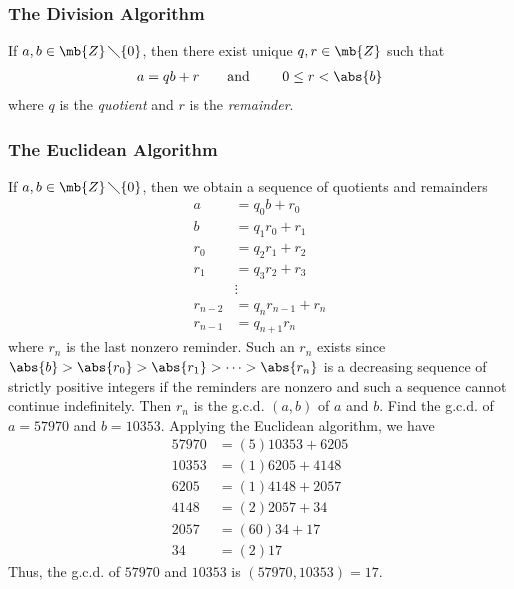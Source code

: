 \subsubsection{The Division Algorithm}
If $a,b\in \mb{Z}\,\diagdown\{0\}$, then there exist unique $q,r\in \mb{Z}$ such that
\begin{align*}
    a = qb + r \text{\qquad and \qquad} 0\le r < \abs{b}
\end{align*}
where $q$ is the {\sl quotient} and $r$ is the {\sl remainder}.
\newpage
\thispagestyle{oddpagestyle}

\subsubsection{The Euclidean Algorithm}
If $a,b\in \mb{Z}\,\diagdown\{0\}$, then we obtain a sequence of quotients and remainders
\begin{align*}
    a &= q_{0} b + r_{0}\tag{0}\\
    b &= q_{1} r_{0} + r_{1}\tag{1}\\
    r_{0} &= q_{2} r_{1} + r_{2}\tag{2}\\
    r_{1} &= q_{3} r_{2} + r_{3}\tag{3}\\
    &\vdots\\
    r_{n-2} &= q_{n} r_{n-1} + r_{n}\tag{n}\\
    r_{n-1} &= q_{n+1} r_{n}\tag{$n+1$}
\end{align*}
where $r_{n}$ is the last nonzero reminder. Such an $r_{n}$ exists since
$\abs{b}>\abs{r_{0}}>\abs{r_{1}}>\cdots>\abs{r_{n}}$ is a decreasing sequence of strictly positive integers
if the reminders are nonzero and such a sequence cannot continue indefinitely.
Then $r_{n}$ is the g.c.d. $(a,b)$ of $a$ and $b$.
{Find the g.c.d. of $a=57970$ and $b=10353$.}
{Applying the Euclidean algorithm, we have
\begin{align*}
    57970 &= (5) 10353 + 6205\\
    10353 &= (1) 6205 + 4148\\
    6205 &= (1) 4148 + 2057\\
    4148 &= (2) 2057 + 34\\
    2057 &= (60) 34 + 17\\
    34 &= (2) 17
\end{align*}
Thus, the g.c.d. of $57970$ and $10353$ is $(57970, 10353) = 17$.
}


